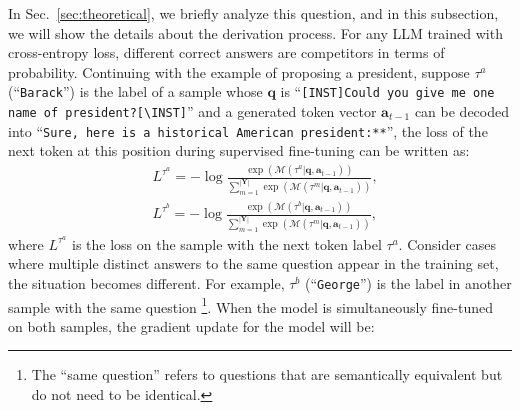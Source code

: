 In Sec.~\ref{sec:theoretical}, we briefly analyze this question, and in this subsection, we will show the details about the derivation process. For any LLM trained with cross-entropy loss, different correct answers are competitors in terms of probability. Continuing with the example of proposing a president, suppose $\tau^{a}$ (``\texttt{Barack}'') is the label of a sample whose $\bm{q}$ is ``\texttt{[INST]Could you give me one name of president?[\textbackslash INST]}'' and a generated token vector $\bm{a}_{t-1}$  can be decoded into ``\texttt{Sure, here is a historical American president:**}'', the loss of the next token at this position during supervised fine-tuning can be written as:
\begin{equation}
\begin{aligned}
 &L^{\tau^a} = - \log \frac{\exp(\mathcal{M}({\tau^a}|\bm{q},\bm{a}_{t-1}))}{\sum_{m=1}^{|\bm{Y}|} \exp(\mathcal{M}(\tau^{m}|\bm{q},\bm{a}_{t-1}))} ,
 \\   &L^{\tau^b} = - \log \frac{\exp(\mathcal{M}(\tau^b|\bm{q},\bm{a}_{t-1}))}{\sum_{m=1}^{|\bm{Y}|} \exp(\mathcal{M}(\tau^{m}|\bm{q},\bm{a}_{t-1}))} ,
\end{aligned}
\end{equation}
where $L^{\tau^a}$ is the loss on the sample with the next token label $\tau^{a}$.
Consider cases where multiple distinct answers to the same question appear in the training set, the situation becomes different. For example, $\tau^{b}$ (``\texttt{George}'') is the label in another sample with the same question \footnote{The ``same question'' refers to questions that are semantically equivalent but do not need to be identical.}. When the model is simultaneously fine-tuned on both samples, the gradient update for the model will be:
